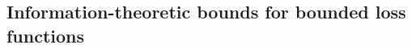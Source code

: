 \documentclass{article}
\theoremstyle{plain}
\theoremstyle{plain}
\newtheorem{theorem}{Theorem}[section]
\theoremstyle{definition}
\theoremstyle{remark}
\newtheorem{remark}[theorem]{Remark}
\newcommand{\var}{\mathrm{Var}}
\begin{document}



\subsection{Information-theoretic bounds for bounded loss functions}\label{sec: expected_bounded}
\end{document}
